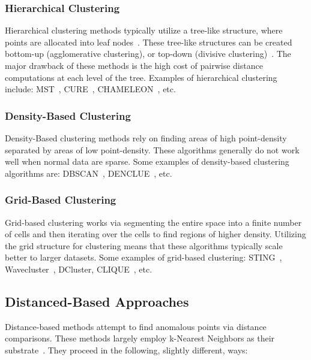 \subsubsection{Hierarchical Clustering}

Hierarchical clustering methods typically utilize a tree-like structure, where points are allocated into leaf nodes~\cite{wang_progress_2019}.
These tree-like structures can be created bottom-up (agglomerative clustering), or top-down (divisive clustering)~\cite{rakesh_agrawal_automatic_1998}.
The major drawback of these methods is the high cost of pairwise distance computations at each level of the tree.
Examples of hierarchical clustering include: 
MST~\cite{charles_zahn_graph_1971}, 
CURE~\cite{noauthor_cure:_nodate}, 
CHAMELEON~\cite{karypis_chameleon:_nodate}, 
etc.

\subsubsection{Density-Based Clustering}

Density-Based clustering methods rely on finding areas of high point-density separated by areas of low point-density.
These algorithms generally do not work well when normal data are sparse.
Some examples of density-based clustering algorithms are: 
DBSCAN~\cite{ester_density-based_nodate}, 
DENCLUE~\cite{Hinneburg1998Effic-5816}, 
etc.

\subsubsection{Grid-Based Clustering}

Grid-based clustering works via segmenting the entire space into a finite number of cells and then iterating over the cells to find regions of higher density.
Utilizing the grid structure for clustering means that these algorithms typically scale better to larger datasets.
Some examples of grid-based clustering: 
STING~\cite{sting:wang}, 
Wavecluster~\cite{Wavecluster:Sheikholeslami:2000}, 
DCluster,  %
CLIQUE~\cite{rakesh_agrawal_automatic_1998}, 
etc.

\subsection{Distanced-Based Approaches}

Distance-based methods attempt to find anomalous points via distance comparisons.
These methods largely employ k-Nearest Neighbors as their substrate~\cite{wang_progress_2019}.
They proceed in the following, slightly different, ways:

